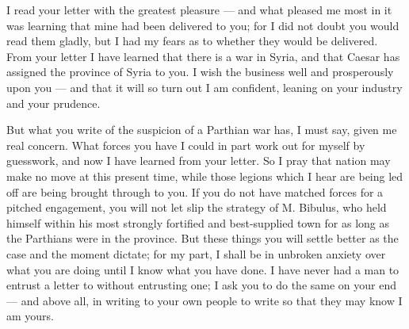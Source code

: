 

 I read your letter with the greatest pleasure --- and what pleased me most in it was learning that mine had been delivered to you; for I did not doubt you would read them gladly, but I had my fears as to whether they would be delivered. From your letter I have learned that there is a war in Syria, and that Caesar has assigned the province of Syria to you. I wish the business well and prosperously upon you --- and that it will so turn out I am confident, leaning on your industry and your prudence.

 But what you write of the suspicion of a Parthian war has, I must say, given me real concern. What forces you have I could in part work out for myself by guesswork, and now I have learned from your letter. So I pray that nation may make no move at this present time, while those legions which I hear are being led off are being brought through to you. If you do not have matched forces for a pitched engagement, you will not let slip the strategy of M. Bibulus, who held himself within his most strongly fortified and best-supplied town for as long as the Parthians were in the province. But these things you will settle better as the case and the moment dictate; for my part, I shall be in unbroken anxiety over what you are doing until I know what you have done. I have never had a man to entrust a letter to without entrusting one; I ask you to do the same on your end --- and above all, in writing to your own people to write so that they may know I am yours.
